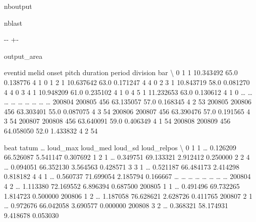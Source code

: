 \documentclass[letterpaper,10pt,english]{sphinxmanual}
\newlength\nbsphinxcodecellspacing
\begin{document}
\begin{sphinxuseclass}{nboutput}
\begin{sphinxuseclass}{nblast}
{

\kern-\sphinxverbatimsmallskipamount\kern-\baselineskip
\kern+\FrameHeightAdjust\kern-\fboxrule
\vspace{\nbsphinxcodecellspacing}

\begin{sphinxuseclass}{output_area}
\begin{sphinxuseclass}{}


\begin{sphinxVerbatim}[commandchars=\\\{\}]
\llap{\color{nbsphinxout}[44]:\,\hspace{\fboxrule}\hspace{\fboxsep}}        eventid  melid      onset  pitch  duration  period  division  bar  \textbackslash{}
0             1      1  10.343492   65.0  0.138776       4         1    0
1             2      1  10.637642   63.0  0.171247       4         4    0
2             3      1  10.843719   58.0  0.081270       4         4    0
3             4      1  10.948209   61.0  0.235102       4         1    0
4             5      1  11.232653   63.0  0.130612       4         1    0
{\ldots}         {\ldots}    {\ldots}        {\ldots}    {\ldots}       {\ldots}     {\ldots}       {\ldots}  {\ldots}
200804   200805    456  63.135057   57.0  0.168345       4         2   53
200805   200806    456  63.303401   55.0  0.087075       4         3   54
200806   200807    456  63.390476   57.0  0.191565       4         3   54
200807   200808    456  63.640091   59.0  0.406349       4         1   54
200808   200809    456  64.058050   52.0  1.433832       4         2   54

        beat  tatum  {\ldots}  loud\_max   loud\_med   loud\_sd loud\_relpos  \textbackslash{}
0          1      1  {\ldots}  0.126209  66.526087  5.541147    0.307692
1          2      1  {\ldots}  0.349751  69.133321  2.912412    0.250000
2          2      4  {\ldots}  0.094051  66.352130  3.564563    0.428571
3          3      1  {\ldots}  0.521187  66.484173  2.414298    0.818182
4          4      1  {\ldots}  0.560737  71.699054  2.185794    0.166667
{\ldots}      {\ldots}    {\ldots}  {\ldots}       {\ldots}        {\ldots}       {\ldots}         {\ldots}
200804     4      2  {\ldots}  1.113380  72.169552  6.896394    0.687500
200805     1      1  {\ldots}  0.491496  69.732265  1.814723    0.500000
200806     1      2  {\ldots}  1.187058  76.628621  2.628726    0.411765
200807     2      1  {\ldots}  0.972676  66.042058  3.690577    0.000000
200808     3      2  {\ldots}  0.368321  58.174931  9.418678    0.053030


\end{sphinxVerbatim}
\end{sphinxuseclass}
\end{sphinxuseclass}}
\end{sphinxuseclass}
\end{sphinxuseclass}
\end{document}
